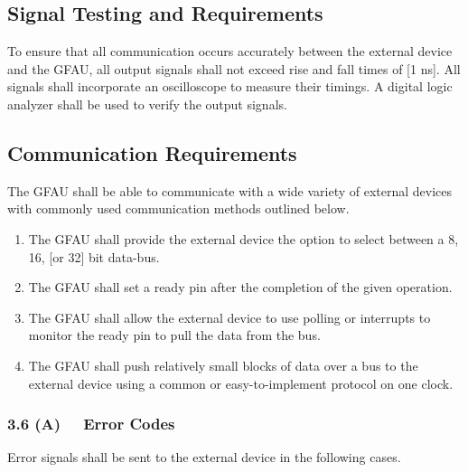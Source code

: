 \documentclass[12pt]{extarticle}
\begin{document}
        \subsection{Signal Testing and Requirements} To ensure that all
        communication occurs accurately between the external device and the
        GFAU, all output signals shall not exceed rise and fall times of [1
        ns]. All signals shall incorporate an oscilloscope to measure their
        timings. A digital logic analyzer shall be used to verify the output
        signals.

        \subsection{Communication Requirements} The GFAU shall be able to
        communicate with a wide variety of external devices with commonly used
        communication methods outlined below.

        \begin{enumerate}

            \item The GFAU shall provide the external device the option to
            select between a 8, 16, [or 32] bit data-bus.

            \item The GFAU shall set a ready pin after the completion of the
            given operation.

            \item The GFAU shall allow the external device to use polling or
            interrupts to monitor the ready pin to pull the data from the bus.

            \item The GFAU shall push relatively small blocks of data over a
            bus to the external device using a common or easy-to-implement
            protocol on one clock.

        \end{enumerate}

        \subsubsection*{3.6 (A) \ \ Error Codes} Error signals shall be sent to the
        external device in the following cases.
\end{document}
